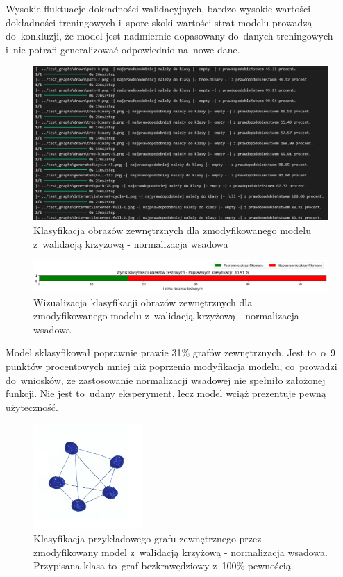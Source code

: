 Wysokie fluktuacje dokładności walidacyjnych, bardzo wysokie wartości dokładności treningowych
i~spore skoki wartości strat modelu prowadzą do~konkluzji,
że model jest nadmiernie dopasowany do~danych treningowych i~nie potrafi generalizować odpowiednio na~nowe dane.

\begin{figure}[ht]
	\centering
	\includegraphics[width=15.5cm]{resources/tests/images/v4/crossvalid_2_txt.png}
	\caption{Klasyfikacja obrazów zewnętrznych dla zmodyfikowanego modelu z~walidacją krzyżową - normalizacja wsadowa}
	\label{Fig:tests-cv-2b}
\end{figure}
\FloatBarrier

\begin{figure}[ht]
	\centering
	\includegraphics[width=15.5cm]{resources/tests/images/v4/crossvalid_2_bar.png}
	\caption{Wizualizacja klasyfikacji obrazów zewnętrznych dla zmodyfikowanego modelu z~walidacją krzyżową - normalizacja wsadowa}
	\label{Fig:tests-cv-2c}
\end{figure}
\FloatBarrier

Model sklasyfikował poprawnie prawie 31\% grafów zewnętrznych.
Jest to~o~9 punktów procentowych mniej niż poprzenia modyfikacja modelu,
co~prowadzi do~wniosków, że zastosowanie normalizacji wsadowej nie spełniło założonej funkcji.
Nie jest to~udany eksperyment, lecz model wciąż prezentuje pewną użyteczność.

\begin{figure}[ht]
	\centering
	\includegraphics[height=4cm]{../graph_classification/test_graphs/drawn/full-8.png}
	\caption{Klasyfikacja przykładowego grafu zewnętrznego przez zmodyfikowany model z~walidacją krzyżową - normalizacja wsadowa.
		Przypisana klasa to~graf bezkrawędziowy z~100\% pewnością.}
	\label{Fig:tests-cv-2d}
\end{figure}
\FloatBarrier

